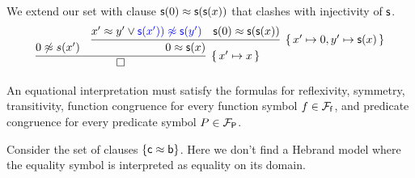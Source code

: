 \begin{example} We extend our set with clause ${\mathsf s}(0) \approx {\mathsf s}({\mathsf s}(x))$ 
	that clashes with injectivity of ${\mathsf s}$.
	\begin{gather*}
	\infer[\{\,x'\mapsto x\,\}]
	{\square}
	{0\mNE s(x') &
	\infer[
	\{\, x'\mapsto 0, y'\mapsto\msucc(x) \,\}
	]{
		0 \mEQ \msucc(x)	
	}{
		x' \mEQ y' \lor {\colN \msucc(x')) \mNE \msucc(y')} 
		& {\msucc(0) \mEQ \msucc(\msucc(x))}
	}
}
	\end{gather*}
\end{example}


	An equational interpretation must satisfy the formulas for reflexivity, symmetry, transitivity, 
	function congruence for every function symbol $f\in{{\mathcal F}_{\mathsf f}}$, 
	and predicate congruence for every predicate symbol $P\in{{\mathcal F}_{\mathsf P}}$.

%

\begin{example}
	Consider the set of clauses $\{ {\mathsf c} \approx {\mathsf b} \}$. 
	Here we don't find a Hebrand model where the equality symbol is interpreted as equality on its domain.
\end{example}


